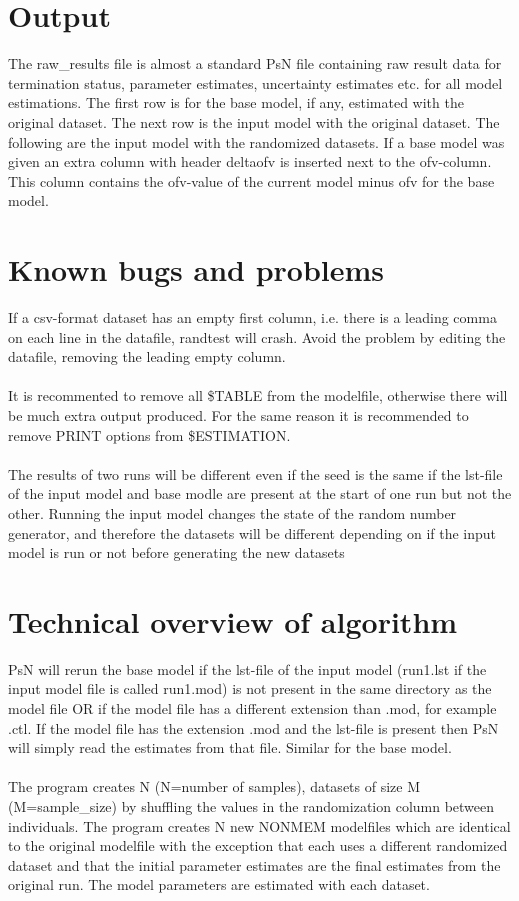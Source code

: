 \documentclass[a4paper,12pt]{article}
\begin{document}
\section{Output}

The raw\_results file is almost a standard PsN file containing raw result data for termination status, parameter estimates, uncertainty estimates etc. for all model estimations. The first row is for the base model, if any, estimated with the original dataset. The next row is the input model with the original dataset. The following are the input model with the randomized datasets. If a base model was given an extra column with header deltaofv is inserted next to the ofv-column. This column contains the ofv-value of the current model minus ofv for the base model.

\section{Known bugs and problems}

If a csv-format dataset has an empty first column, i.e. there is a leading comma on each line in the datafile, randtest will crash. Avoid the problem by editing the datafile, removing the leading empty column.
\\
\\
It is recommented to remove all \$TABLE from the modelfile, otherwise there will be much extra output produced. For the same reason it is recommended to remove PRINT options from \$ESTIMATION. 
\\
\\
The results of two runs will be different even if the seed is the same if the lst-file of the input model and base modle are present at the start of one run but not the other. Running the input model changes the state of the random number generator, and therefore the datasets will be different depending on if the input model is run or not before generating the  new datasets

\section{Technical overview of algorithm}

PsN will rerun the base model if the lst-file of the input model (run1.lst if the input model file is called run1.mod) is not present in the same directory as the model file OR if the model file has a different extension than .mod, for example .ctl. If the model file has the extension .mod and the lst-file is present then PsN will simply read the estimates from that file. Similar for the base model.
\\
\\
The program creates N (N=number of samples), datasets of size M (M=sample\_size) by shuffling the values in the randomization column between individuals. The program creates N new NONMEM modelfiles which are identical to the original modelfile with the exception that each uses a different randomized dataset and that the initial parameter estimates are the final estimates from the original run. The model parameters are estimated with each dataset.
\end{document}
